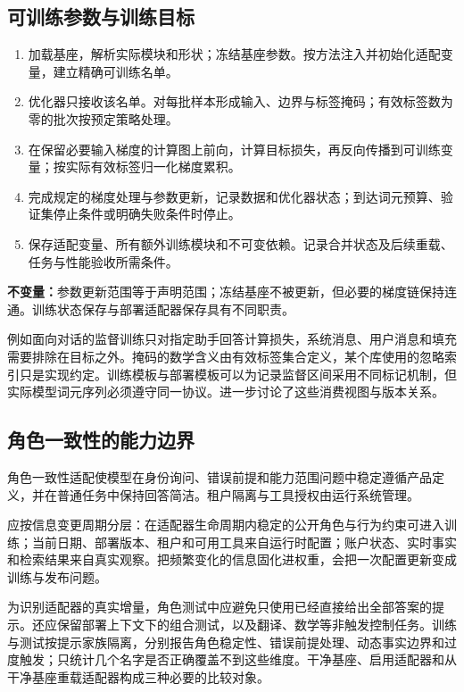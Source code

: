 \documentclass[../textbook.tex]{subfiles}
\begin{document}
\subsection{可训练参数与训练目标}
\begin{algorithm}[冻结基座的适配训练]
\label{alg:peft-training}
\begin{enumerate}
\item 加载基座，解析实际模块和形状；冻结基座参数。按方法注入并初始化适配变量，建立精确可训练名单。
\item 优化器只接收该名单。对每批样本形成输入、边界与标签掩码；有效标签数为零的批次按预定策略处理。
\item 在保留必要输入梯度的计算图上前向，计算目标损失，再反向传播到可训练变量；按实际有效标签归一化梯度累积。
\item 完成规定的梯度处理与参数更新，记录数据和优化器状态；到达词元预算、验证集停止条件或明确失败条件时停止。
\item 保存适配变量、所有额外训练模块和不可变依赖。记录合并状态及后续重载、任务与性能验收所需条件。
\end{enumerate}
\textbf{不变量：}参数更新范围等于声明范围；冻结基座不被更新，但必要的梯度链保持连通。训练状态保存与部署适配器保存具有不同职责。
\end{algorithm}

例如面向对话的监督训练只对指定助手回答计算损失，系统消息、用户消息和填充需要排除在目标之外。掩码的数学含义由有效标签集合定义，某个库使用的忽略索引只是实现约定。训练模板与部署模板可以为记录监督区间采用不同标记机制，但实际模型词元序列必须遵守同一协议。进一步讨论了这些消费视图与版本关系。

\subsection{角色一致性的能力边界}
角色一致性适配使模型在身份询问、错误前提和能力范围问题中稳定遵循产品定义，并在普通任务中保持回答简洁。租户隔离与工具授权由运行系统管理。

应按信息变更周期分层：在适配器生命周期内稳定的公开角色与行为约束可进入训练；当前日期、部署版本、租户和可用工具来自运行时配置；账户状态、实时事实和检索结果来自真实观察。把频繁变化的信息固化进权重，会把一次配置更新变成训练与发布问题。

为识别适配器的真实增量，角色测试中应避免只使用已经直接给出全部答案的提示。还应保留部署上下文下的组合测试，以及翻译、数学等非触发控制任务。训练与测试按提示家族隔离，分别报告角色稳定性、错误前提处理、动态事实边界和过度触发；只统计几个名字是否正确覆盖不到这些维度。干净基座、启用适配器和从干净基座重载适配器构成三种必要的比较对象。
\end{document}
